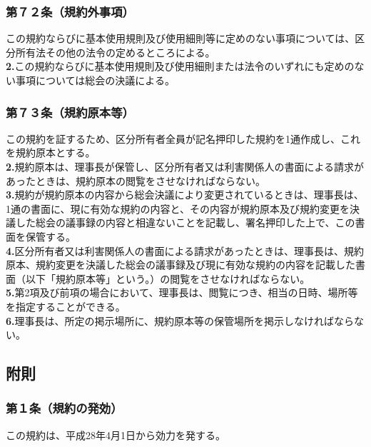 \documentclass[12pt,uplatex]{jsarticle}
\begin{document}
\subsubsection*{第７２条（規約外事項）}
この規約ならびに基本使用規則及び使用細則等に定めのない事項については、区分所有法その他の法令の定めるところによる。\\
\textbf{2.}この規約ならびに基本使用規則及び使用細則または法令のいずれにも定めのない事項については総会の決議による。
\subsubsection*{第７３条（規約原本等）}
この規約を証するため、区分所有者全員が記名押印した規約を1通作成し、これを規約原本とする。\\
\textbf{2.}規約原本は、理事長が保管し、区分所有者又は利害関係人の書面による請求があったときは、規約原本の閲覧をさせなければならない。\\
\textbf{3.}規約が規約原本の内容から総会決議により変更されているときは、理事長は、1通の書面に、現に有効な規約の内容と、その内容が規約原本及び規約変更を決議した総会の議事録の内容と相違ないことを記載し、署名押印した上で、この書面を保管する。\\
\textbf{4.}区分所有者又は利害関係人の書面による請求があったときは、理事長は、規約原本、規約変更を決議した総会の議事録及び現に有効な規約の内容を記載した書面（以下「規約原本等」という。）の閲覧をさせなければならない。\\
\textbf{5.}第2項及び前項の場合において、理事長は、閲覧につき、相当の日時、場所等を指定することができる。\\
\textbf{6.}理事長は、所定の掲示場所に、規約原本等の保管場所を掲示しなければならない。

\begin{center}
\subsection*{附則}
\end{center}
\subsubsection*{第１条（規約の発効）}
この規約は、平成28年4月1日から効力を発する。
\end{document}
